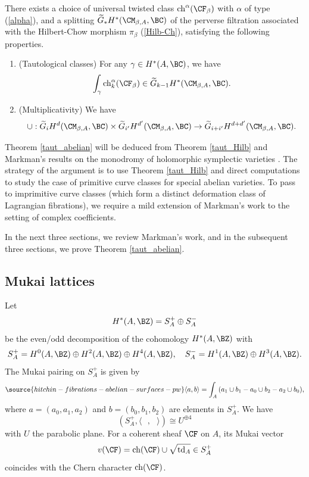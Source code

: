 \begin{thm}
\notready\label{taut_abelian}
There exists a choice of universal twisted class
$\mathrm{ch}^\alpha(\CF_\beta)$ with $\alpha$ of  type (\ref{alpha}),
and a splitting $\widetilde{G}_\ast H^\ast(\CM_{\beta,A}, \BC)$ of the perverse filtration associated with
the Hilbert-Chow morphism $\pi_\beta$ (\ref{Hilb-Ch}), satisfying the following properties.
\begin{enumerate}
    \item[(a)](Tautological classes) For any $\gamma \in H^*(A, \BC)$, we have
    \[
   \int_\gamma \mathrm{ch}^\alpha_k(\CF_\beta) \in \widetilde{G}_{k-1}H^*(\CM_{\beta,A}, \BC).
    \]
    \item[(b)](Multiplicativity) We have
    \[
   \cup: \widetilde{G}_i H^d(\CM_{\beta,A}, \BC) \times \widetilde{G}_{i'} H^{d'}(\CM_{\beta,A}, \BC) \to \widetilde{G}_{i+i'}H^{d+d'}(\CM_{\beta,A}, \BC).
    \]
\end{enumerate}
\end{thm}



Theorem \ref{taut_abelian} will be deduced from Theorem \ref{taut_Hilb}  and  Markman's results on the monodromy of holomorphic symplectic varieties
\cite{Markman2,Markman3}.
The strategy of the argument is to use Theorem \ref{taut_Hilb} and direct computations to study the case of primitive curve classes for special abelian varieties. To pass to imprimitive curve classes (which form a distinct deformation class of Lagrangian fibrations), we require a mild extension of Markman's work to the setting of complex coefficients.

In the next three sections, we review Markman's work, and in the subsequent three sections, we  prove
Theorem \ref{taut_abelian}.




\subsection{Mukai lattices}


Let
\[
H^\ast(A, \BZ) = S_A^+ \oplus S_A^-
\]
be the even/odd decomposition of the cohomology $H^\ast(A, \BZ)$ with
\[
S_A^+ = H^0(A, \BZ) \oplus H^2(A, \BZ)\oplus H^4(A,\BZ), \quad S_A^- = H^1(A,\BZ)\oplus H^3(A,\BZ).
\]
The Mukai pairing on $S_A^+$ is given by
\begin{equation}\label{Mukai_pair}
\source{hitchin-fibrations-abelian-surfaces-pw}
\langle a, b \rangle = \int_A {(a_1\cup b_1 - a_0\cup b_2-a_2\cup b_0)},
\end{equation}
where $a=(a_0, a_1,a_2)$ and $b=(b_0, b_1, b_2)$ are elements in $S_A^+$. We have
\[
(S_A^+, \langle ~~~, ~~~ \rangle) \cong U^{\oplus 4}
\]
with $U$ the parabolic plane. For a coherent sheaf $\CF$ on $A$, its Mukai vector
\[
v(\CF) = \mathrm{ch}(\CF) \cup \sqrt{\mathrm{td}_A}  \in S_A^+
\]
coincides with the Chern character $\mathrm{ch}(\CF)$.

